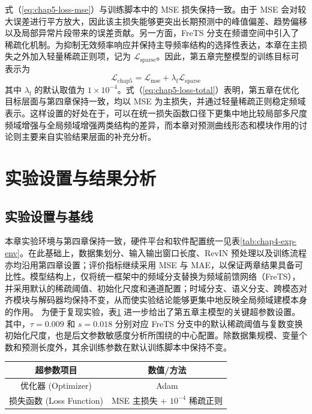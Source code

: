式（\ref{eq:chap5-loss-mse}）与训练脚本中的 MSE 损失保持一致。由于 MSE 会对较大误差进行平方放大，因此该主损失能够更突出长期预测中的峰值偏差、趋势偏移以及局部异常片段带来的误差贡献。另一方面，FreTS 分支在频谱空间中引入了稀疏化机制。为抑制无效频率响应并保持主导频率结构的选择性表达，本章在主损失之外加入轻量稀疏正则项，记为 $\mathcal{L}_{\mathrm{sparse}}$。因此，第五章完整模型的训练目标可表示为
\begin{equation}
\mathcal{L}_{\mathrm{chap5}}
= \mathcal{L}_{\mathrm{mse}} + \lambda_{\mathrm{f}}\mathcal{L}_{\mathrm{sparse}}
\label{eq:chap5-loss-total}
\end{equation}
其中 $\lambda_{\mathrm{f}}$ 的默认取值为 $1\times 10^{-4}$。式（\ref{eq:chap5-loss-total}）表明，第五章在优化目标层面与第四章保持一致，均以 MSE 为主损失，并通过轻量稀疏正则稳定频域表示。这样设置的好处在于，可以在统一损失函数口径下更集中地比较局部多尺度频域增强与全局频域增强两类结构的差异，而本章对预测曲线形态和模块作用的讨论则主要来自实验结果层面的补充分析。 \section{实验设置与结果分析} \subsection{实验设置与基线} 本章实验环境与第四章保持一致，硬件平台和软件配置统一见表\ref{tab:chap4-exp-env}。在此基础上，数据集划分、输入输出窗口长度、RevIN 预处理以及训练流程亦均沿用第四章设置；评价指标继续采用 MSE 与 MAE，以保证两章结果具备可比性。模型结构上，仅将统一框架中的频域分支替换为频域前馈网络（FreTS），并采用默认的稀疏阈值、初始化尺度和通道配置；时域分支、语义分支、跨模态对齐模块与解码器均保持不变，从而使实验结论能够更集中地反映全局频域建模本身的作用。 为便于复现实验，表\ref{tab:chap5-hparams} 进一步给出了第五章主模型的关键超参数设置。其中，$\tau=0.009$ 和 $s=0.018$ 分别对应 FreTS 分支中的默认稀疏阈值与复数变换初始化尺度，也是后文参数敏感度分析所围绕的中心配置。除数据集规模、变量个数和预测长度外，其余训练参数在默认训练脚本中保持不变。 \begin{table}[!htb]
\centering
\small
\setlength{\tabcolsep}{4.2pt}
\renewcommand{\arraystretch}{1.02}
\label{tab:chap5-hparams}
\begin{tabular}{c|c}
\toprule
\textbf{超参数项目} & \textbf{数值/方法} \\
\midrule
优化器 (Optimizer) & Adam \\
损失函数 (Loss Function) & MSE 主损失 + $10^{-4}$ 稀疏正则 \\

\end{tabular}
\end{table}
